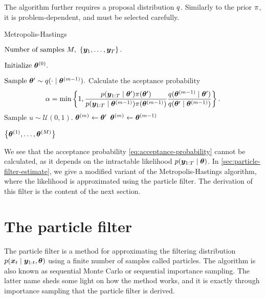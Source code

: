 The algorithm further requires a proposal distribution $q$. Similarly to the prior $\pi$, it is problem-dependent, and must be selected carefully.

\begin{algorithm}[ht]
    \caption{Metropolis-Hastings}
    \label{alg:metropolis-hastings}
    \begin{algorithmic}[1]
        \Input $\text{Number of samples } M,\ \left\{\by_1, \ldots, \by_T\right\}.$
        
        \State $\text{Initialize } \bm{\theta}^{(0)}.$
        
            \State $\text{Sample } \bm{\theta}^\prime \sim q(\cdot \mid \bm{\theta}^{(m-1)}).$
            \State $\text{Calculate the aceptance probability } $ \begin{equation} \label{eq:acceptance-probability}
            \alpha = \min \left\{1, \frac{p(\bm{y}_{1:T} \mid \bm{\theta}^\prime) \pi(\bm{\theta}^\prime)}{p(\bm{y}_{1:T} \mid \bm{\theta}^{(m-1)}) \pi(\bm{\theta}^{(m-1)})} \frac{q(\bm{\theta}^{(m-1)} \mid \bm{\theta}^\prime)}{q(\bm{\theta}^\prime \mid \bm{\theta}^{(m-1)})} \right\}.
            \end{equation}
            \State $\text{Sample } u \sim \mathcal{U}(0,1).$
                \State $\bm{\theta}^{(m)} \gets \bm{\theta}^\prime$ 
            \Else
                \State $\bm{\theta}^{(m)} \gets \bm{\theta}^{(m-1)}$ 
            \EndIf
        \EndFor
        
        \Output $\left\{ \bm{\theta}^{(1)}, \ldots, \bm{\theta}^{(M)} \right\}$
    \end{algorithmic}
\end{algorithm}

We see that the acceptance probability \eqref{eq:acceptance-probability} cannot be calculated, as it depends on the intractable likelihood $p(\bm{y}_{1:T} \mid \bm{\theta})$. In \autoref{sec:particle-filter-estimate}, we give a modified variant of the Metropolis-Hastings algorithm, where the likelihood is approximated using the particle filter. The derivation of this filter is the content of the next section.



\section{The particle filter} \label{sec:particle-filter}
The particle filter \citep{particle-filter} is a method for approximating the filtering distribution $p(\bm{x}_t \mid \bm{y}_{1:t}, \bm{\theta})$ using a finite number of samples called particles. The algorithm is also known as sequential Monte Carlo or sequential importance sampling. The latter name sheds some light on how the method works, and it is exactly through importance sampling that the particle filter is derived.

